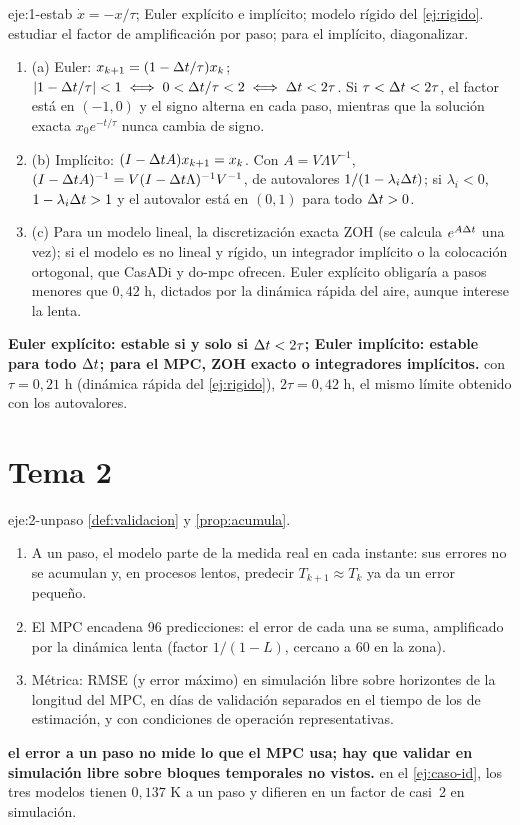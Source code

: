 \begin{solucion}{eje:1-estab}
\datos $\dot x=-x/\tau$; Euler explícito e implícito; modelo rígido del \cref{ej:rigido}.
\planteamiento estudiar el factor de amplificación por paso; para el implícito, diagonalizar.
\pasos
\begin{enumerate}[label=\arabic*.]
  \item (a) Euler: $x_{k+1}=(1-\Delta t/\tau)x_k$; $\lvert1-\Delta t/\tau\rvert<1\iff0<\Delta t/\tau<2\iff\Delta t<2\tau$. Si $\tau<\Delta t<2\tau$, el factor está en $(-1,0)$ y el signo alterna en cada paso, mientras que la solución exacta $x_0e^{-t/\tau}$ nunca cambia de signo.
  \item (b) Implícito: $(I-\Delta t A)x_{k+1}=x_k$. Con $A=V\Lambda V^{-1}$, $(I-\Delta t A)^{-1}=V(I-\Delta t\Lambda)^{-1}V^{-1}$, de autovalores $1/(1-\lambda_i\Delta t)$; si $\lambda_i<0$, $1-\lambda_i\Delta t>1$ y el autovalor está en $(0,1)$ para todo $\Delta t>0$.
  \item (c) Para un modelo lineal, la discretización exacta ZOH (se calcula $e^{A\Delta t}$ una vez); si el modelo es no lineal y rígido, un integrador implícito o la colocación ortogonal, que CasADi y do-mpc ofrecen. Euler explícito obligaría a pasos menores que $0{,}42$ h, dictados por la dinámica rápida del aire, aunque interese la lenta.
\end{enumerate}
\resultado \textbf{Euler explícito: estable si y solo si $\Delta t<2\tau$; Euler implícito: estable para todo $\Delta t$; para el MPC, ZOH exacto o integradores implícitos.}
\comprobacion con $\tau=0{,}21$ h (dinámica rápida del \cref{ej:rigido}), $2\tau=0{,}42$ h, el mismo límite obtenido con los autovalores.
\end{solucion}

\section{Tema 2}

\begin{solucion}{eje:2-unpaso}
\planteamiento \cref{def:validacion} y \cref{prop:acumula}.
\pasos
\begin{enumerate}[label=\arabic*.]
  \item A un paso, el modelo parte de la medida real en cada instante: sus errores no se acumulan y, en procesos lentos, predecir $T_{k+1}\approx T_k$ ya da un error pequeño.
  \item El MPC encadena 96 predicciones: el error de cada una se suma, amplificado por la dinámica lenta (factor $1/(1-L)$, cercano a 60 en la zona).
  \item Métrica: RMSE (y error máximo) en simulación libre sobre horizontes de la longitud del MPC, en días de validación separados en el tiempo de los de estimación, y con condiciones de operación representativas.
\end{enumerate}
\resultado \textbf{el error a un paso no mide lo que el MPC usa; hay que validar en simulación libre sobre bloques temporales no vistos.}
\comprobacion en el \cref{ej:caso-id}, los tres modelos tienen $0{,}137$ K a un paso y difieren en un factor de casi~2 en simulación.
\end{solucion}

